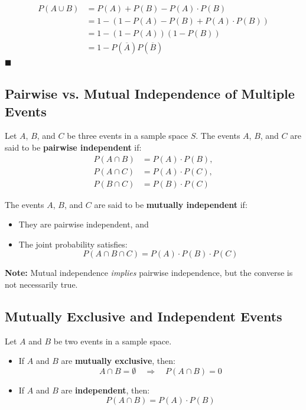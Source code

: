\documentclass[twoside]{book}
\begin{document}
\begin{align*}
    P(A \cup B) &= P(A) + P(B) - P(A)\cdot P(B) \\
    &= 1 - \left(1 - P(A) - P(B) + P(A)\cdot P(B)\right) \\
    &= 1- (1-P(A))(1-P(B)) \\
    &= 1 - P(\overline{A})P(\overline{B})
\end{align*}
\hfill\(\blacksquare\)

\subsection{Pairwise vs. Mutual Independence of Multiple Events}

Let \( A \), \( B \), and \( C \) be three events in a sample space \( S \). The events \( A \), \( B \), and \( C \) are said to be \textbf{pairwise independent} if:
\[
\begin{aligned}
P(A \cap B) &= P(A) \cdot P(B), \\
P(A \cap C) &= P(A) \cdot P(C), \\
P(B \cap C) &= P(B) \cdot P(C)
\end{aligned}
\]

The events \( A \), \( B \), and \( C \) are said to be \textbf{mutually independent} if:
\begin{itemize}
    \item They are pairwise independent, and
    \item The joint probability satisfies:
    \[
    P(A \cap B \cap C) = P(A) \cdot P(B) \cdot P(C)
    \]
\end{itemize}

\textbf{Note:} Mutual independence \emph{implies} pairwise independence, but the converse is not necessarily true.

\subsection{Mutually Exclusive and Independent Events}

Let \( A \) and \( B \) be two events in a sample space.

\begin{itemize}
    \item If \( A \) and \( B \) are \textbf{mutually exclusive}, then:
    \[
    A \cap B = \emptyset \quad \Rightarrow \quad P(A \cap B) = 0
    \]
    
    \item If \( A \) and \( B \) are \textbf{independent}, then:
    \[
    P(A \cap B) = P(A) \cdot P(B)
    \]
\end{itemize}
\end{document}
